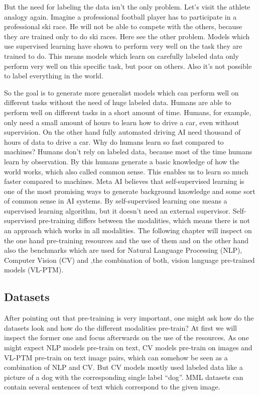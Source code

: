\documentclass[
]{krantz}
\begin{document}
But the need for labeling the data isn't the only problem. Let's visit the athlete analogy again. Imagine a professional football player has to participate in a professional ski race. He will not be able to compete with the others, because they are trained only to do ski races. Here see the other problem. Models which use supervised learning have shown to perform very well on the task they are trained to do. This means models which learn on carefully labeled data only perform very well on this specific task, but poor on others. Also it's not possible to label everything in the world.

So the goal is to generate more generalist models which can perform well on different tasks without the need of huge labeled data. Humans are able to perform well on different tasks in a short amount of time. Humans, for example, only need a small amount of hours to learn how to drive a car, even without supervision. On the other hand fully automated driving AI need thousand of hours of data to drive a car. Why do humans learn so fast compared to machines?
Humans don't rely on labeled data, because most of the time humans learn by observation. By this humans generate a basic knowledge of how the world works, which also called common sense. This enables us to learn so much faster compared to machines.
Meta AI \citep{darkMatter} believes that self-supervised learning is one of the most promising ways to generate background knowledge and some sort of common sense in AI systems. By self-supervised learning one means a supervised learning algorithm, but it doesn't need an external supervisor. Self-supervised pre-training differs between the modalities, which means there is not an approach which works in all modalities.
The following chapter will inspect on the one hand pre-training resources and the use of them and on the other hand also the benchmarks which are used for Natural Language Processing (NLP), Computer Vision (CV) and ,the combination of both, vision language pre-trained models (VL-PTM).

\hypertarget{datasets}{%
\subsection{Datasets}\label{datasets}}

After pointing out that pre-training is very important, one might ask how do the datasets look and how do the different modalities pre-train? At first we will inspect the former one and focus afterwards on the use of the resources. As one might expect NLP models pre-train on text, CV models pre-train on images and VL-PTM pre-train on text image pairs, which can somehow be seen as a combination of NLP and CV. But CV models mostly used labeled data like a picture of a dog with the corresponding single label ``dog''. MML datasets can contain several sentences of text which correspond to the given image.
\end{document}
